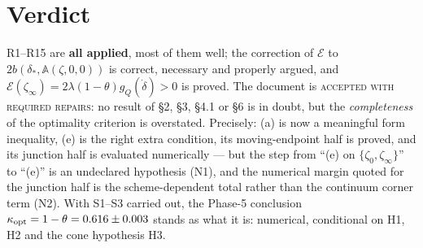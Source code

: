 \documentclass[11pt]{article}
\newcommand{\Aop}{\mathbb A}
\begin{document}
\section{Verdict}\label{sec:verdict}
R1--R15 are \textbf{all applied}, most of them well; the correction of $\mathcal E$ to
$2b(\delta_*,\Aop(\zeta,0,0))$ is correct, necessary and properly argued, and
$\mathcal E(\zeta_\infty)=2\lambda(1-\theta)g_Q(\dot\delta)>0$ is proved.  The document is
\textsc{accepted with required repairs}: no result of \S2, \S3, \S4.1 or \S6 is in doubt,
but the \emph{completeness} of the optimality criterion is overstated.  Precisely: (a) is
now a meaningful form inequality, (e) is the right extra condition, its moving-endpoint
half is proved, and its junction half is evaluated numerically --- but the step from ``(e)
on $\{\zeta_0,\zeta_\infty\}$'' to ``(e)'' is an undeclared hypothesis (N1), and the
numerical margin quoted for the junction half is the scheme-dependent total rather than the
continuum corner term (N2).  With S1--S3 carried out, the Phase-5 conclusion
$\kappa_{\rm opt}=1-\theta=0.616\pm0.003$ stands as what it is: numerical, conditional on
H1, H2 and the cone hypothesis H3.
\end{document}
